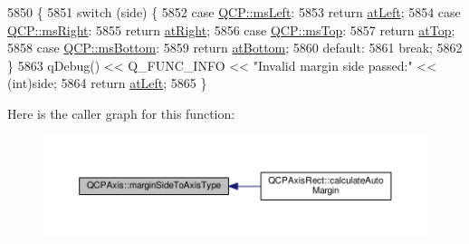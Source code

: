 \begin{DoxyCode}
5850                                                                 \{
5851   \textcolor{keywordflow}{switch} (side) \{
5852   \textcolor{keywordflow}{case} \hyperlink{namespace_q_c_p_a7e487e3e2ccb62ab7771065bab7cae54a9500c8bfcc9e80b9dff0a8e00e867f07}{QCP::msLeft}:
5853     \textcolor{keywordflow}{return} \hyperlink{class_q_c_p_axis_ae2bcc1728b382f10f064612b368bc18aaf84aa6cac6fb6099f54a2cbf7546b730}{atLeft};
5854   \textcolor{keywordflow}{case} \hyperlink{namespace_q_c_p_a7e487e3e2ccb62ab7771065bab7cae54a93c719593bb2b94ed244d52c86d83b65}{QCP::msRight}:
5855     \textcolor{keywordflow}{return} \hyperlink{class_q_c_p_axis_ae2bcc1728b382f10f064612b368bc18aadf5509f7d29199ef2f263b1dd224b345}{atRight};
5856   \textcolor{keywordflow}{case} \hyperlink{namespace_q_c_p_a7e487e3e2ccb62ab7771065bab7cae54a5db8fb0d0b0ecf0d611c2602a348e8a0}{QCP::msTop}:
5857     \textcolor{keywordflow}{return} \hyperlink{class_q_c_p_axis_ae2bcc1728b382f10f064612b368bc18aac0ece2b680d3f545e701f75af1655977}{atTop};
5858   \textcolor{keywordflow}{case} \hyperlink{namespace_q_c_p_a7e487e3e2ccb62ab7771065bab7cae54a5241d8eac2bab9524a38889f576179cc}{QCP::msBottom}:
5859     \textcolor{keywordflow}{return} \hyperlink{class_q_c_p_axis_ae2bcc1728b382f10f064612b368bc18aa220d68888516b6c3b493d144f1ba438f}{atBottom};
5860   \textcolor{keywordflow}{default}:
5861     \textcolor{keywordflow}{break};
5862   \}
5863   qDebug() << Q\_FUNC\_INFO << \textcolor{stringliteral}{"Invalid margin side passed:"} << (int)side;
5864   \textcolor{keywordflow}{return} \hyperlink{class_q_c_p_axis_ae2bcc1728b382f10f064612b368bc18aaf84aa6cac6fb6099f54a2cbf7546b730}{atLeft};
5865 \}
\end{DoxyCode}


Here is the caller graph for this function\+:\nopagebreak
\begin{figure}[H]
\begin{center}
\leavevmode
\includegraphics[width=350pt]{class_q_c_p_axis_ac0a6b77bd52bec6c81cd62d167cfeba6_icgraph}
\end{center}
\end{figure}


\hypertarget{class_q_c_p_axis_a18f3a68f2b691af1fd34b6593c886630}{}
